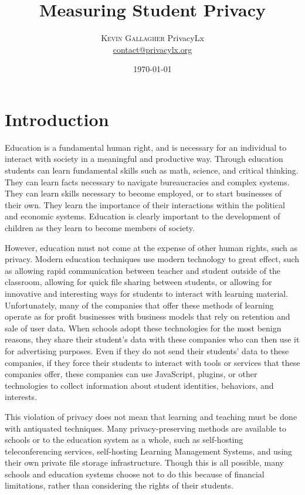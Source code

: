 \documentclass[twoside,twocolumn]{article}
\title{Measuring Student Privacy} %
\author{%
\textsc{Kevin Gallagher}%
\normalsize PrivacyLx \\ %
\normalsize \href{mailto:contact@privacylx.org}{contact@privacylx.org} %
}
\date{\today} %
\begin{document}
\maketitle


\section{Introduction}

Education is a fundamental human right, and is necessary for an individual to interact with society in a meaningful and productive way. Through education students can learn fundamental skills such as math, science, and critical thinking. They can learn facts necessary to navigate bureaucracies and complex systems. They can learn skills necessary to become employed, or to start businesses of their own. They learn the importance of their interactions within the political and economic systems. Education is clearly important to the development of children as they learn to become members of society.

However, education must not come at the expense of other human rights, such as privacy. Modern education techniques use modern technology to great effect, such as allowing rapid communication between teacher and student outside of the classroom, allowing for quick file sharing between students, or allowing for innovative and interesting ways for students to interact with learning material. Unfortunately, many of the companies that offer these methods of learning operate as for profit businesses with business models that rely on retention and sale of user data. When schools adopt these technologies for the most benign reasons, they share their student's data with these companies who can then use it for advertising purposes. Even if they do not send their students' data to these companies, if they force their students to interact with tools or services that these companies offer, these companies can use JavaScript, plugins, or other technologies to collect information about student identities, behaviors, and interests. 

This violation of privacy does not mean that learning and teaching must be done with antiquated techniques. Many privacy-preserving methods are available to schools or to the education system as a whole, such as self-hosting teleconferencing services, self-hosting Learning Management Systems, and using their own private file storage infrastructure. Though this is all possible, many schools and education systems choose not to do this because of financial limitations, rather than considering the rights of their students.
\end{document}
